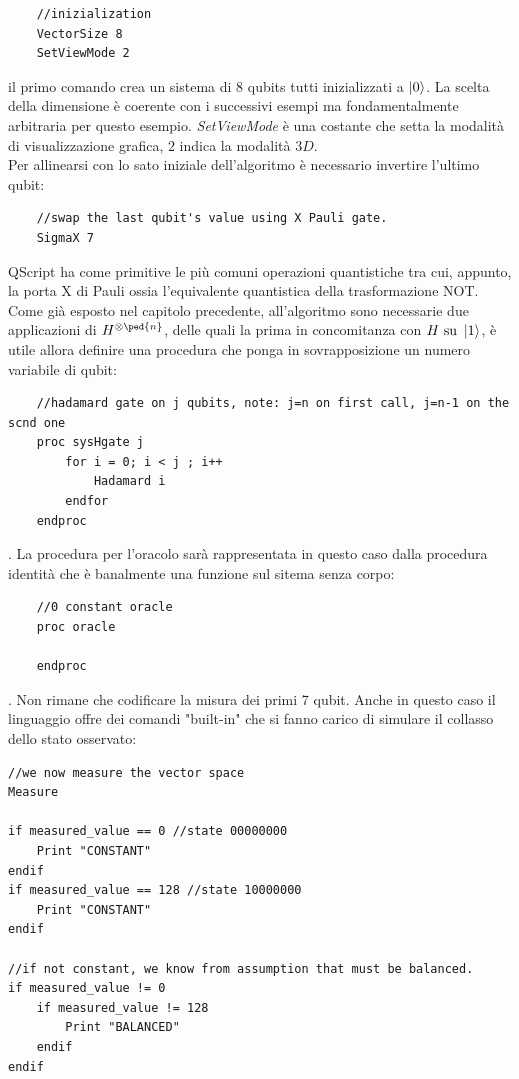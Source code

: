 \documentclass[12pt,a4paper,openright]{report}
\begin{document}
\begin{lstlisting}
    //inizialization
    VectorSize 8
    SetViewMode 2
\end{lstlisting}

il primo comando crea un sistema di 8 qubits tutti inizializzati a $\ket0$. La scelta della dimensione è coerente con i successivi esempi ma fondamentalmente arbitraria per questo esempio.
\textit{SetViewMode} è una costante che setta la modalità di visualizzazione grafica, $2$ indica la modalità $3D$.\\  
Per allinearsi con lo sato iniziale dell'algoritmo è necessario invertire l'ultimo qubit:

\begin{lstlisting}
    //swap the last qubit's value using X Pauli gate.
    SigmaX 7
\end{lstlisting}

QScript ha come primitive le più comuni operazioni quantistiche tra cui, appunto, la porta X di Pauli ossia l'equivalente quantistica della trasformazione NOT.\\
Come già esposto nel capitolo precedente, all'algoritmo sono necessarie due applicazioni di $H^{\otimes\ped{n}}$, delle quali la prima in concomitanza con $H \text{ su } \ket{1}$,
è utile allora definire una procedura che ponga in sovrapposizione un numero variabile di qubit:

\begin{lstlisting}
    //hadamard gate on j qubits, note: j=n on first call, j=n-1 on the scnd one
    proc sysHgate j
        for i = 0; i < j ; i++
            Hadamard i
        endfor
    endproc
\end{lstlisting}

\newpage
. La procedura per l'oracolo sarà rappresentata in questo caso dalla procedura identità che è banalmente una funzione sul sitema senza corpo:

\begin{lstlisting}
    //0 constant oracle
    proc oracle

    endproc
\end{lstlisting}

. Non rimane che codificare la misura dei primi 7 qubit. Anche in questo caso il linguaggio offre dei comandi "built-in" che si fanno carico di simulare il collasso dello stato osservato:

\begin{lstlisting}
//we now measure the vector space
Measure

if measured_value == 0 //state 00000000 
	Print "CONSTANT"
endif
if measured_value == 128 //state 10000000
	Print "CONSTANT"
endif

//if not constant, we know from assumption that must be balanced.
if measured_value != 0
	if measured_value != 128
		Print "BALANCED"
	endif
endif
\end{lstlisting}
\end{document}
